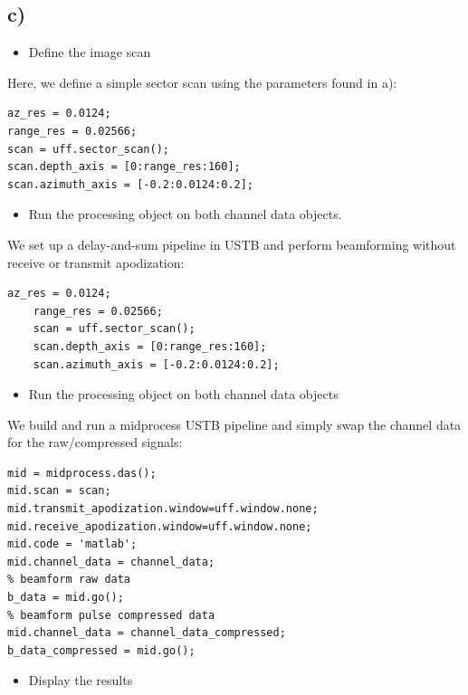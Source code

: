 \documentclass{article}
\begin{document}
\newpage
\subsection*{c)}
\begin{itemize}
    \item Deﬁne the image scan
\end{itemize}

\noindent Here, we define a simple sector scan using the parameters found in a):
\begin{lstlisting}[style=MatlabStyle]
az_res = 0.0124;
range_res = 0.02566;
scan = uff.sector_scan();
scan.depth_axis = [0:range_res:160];
scan.azimuth_axis = [-0.2:0.0124:0.2];    
\end{lstlisting}

\begin{itemize}
    \item Run the processing object on both channel data objects.
\end{itemize}
We set up a delay-and-sum pipeline in USTB and perform beamforming without receive or transmit apodization:
\begin{lstlisting}[style=MatlabStyle]
    az_res = 0.0124;
    range_res = 0.02566;
    scan = uff.sector_scan();
    scan.depth_axis = [0:range_res:160];
    scan.azimuth_axis = [-0.2:0.0124:0.2];    
    \end{lstlisting}

\begin{itemize}
    \item Run the processing object on both channel data objects
\end{itemize}

\noindent We build and run a midprocess USTB pipeline and simply swap the channel data for the raw/compressed signals:
\begin{lstlisting}[style=MatlabStyle]
mid = midprocess.das();
mid.scan = scan;
mid.transmit_apodization.window=uff.window.none;
mid.receive_apodization.window=uff.window.none;
mid.code = 'matlab';
mid.channel_data = channel_data;
% beamform raw data
b_data = mid.go();
% beamform pulse compressed data
mid.channel_data = channel_data_compressed;
b_data_compressed = mid.go();
\end{lstlisting}

\newpage

\begin{itemize}
    \item Display the results
\end{itemize}
\end{document}
